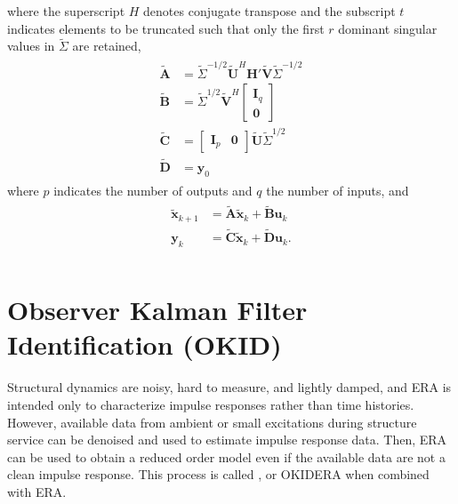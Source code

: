 \documentclass[letterpaper,10pt,english]{sphinxmanual}
\begin{document}
\sphinxAtStartPar
where the superscript \(H\) denotes conjugate transpose and the
subscript \(t\) indicates elements to be truncated such that only
the first \(r\) dominant singular values in \(\tilde{\Sigma}\)
are retained,
\begin{equation*}
\begin{split}\begin{aligned}
    \mathbf{\tilde{A}} &= \tilde{\Sigma}^{-1/2}\mathbf{\tilde{U}}^{H}\mathbf{H'\tilde{V}}\tilde{\Sigma}^{-1/2} \\
    \mathbf{\tilde{B}} &= \tilde{\Sigma}^{1/2}\mathbf{\tilde{V}}^{H}
                        \begin{bmatrix} \mathbf{I}_{q} \\ \mathbf{0} \end{bmatrix} \\
    \mathbf{\tilde{C}} &= \begin{bmatrix} \mathbf{I}_{p} & \mathbf{0} \end{bmatrix} \mathbf{\tilde{U}}\tilde{\Sigma}^{1/2} \\
    \mathbf{\tilde{D}} &= \mathbf{y}_{0}
\end{aligned}\end{split}
\end{equation*}
\sphinxAtStartPar
where \(p\) indicates the number of outputs and \(q\) the number
of inputs, and
\begin{equation*}
\begin{split}\begin{aligned}
    \mathbf{\tilde{x}}_{k+1} &= \mathbf{\tilde{A}\tilde{x}}_{k} + \mathbf{\tilde{B}u}_{k} \\
    \mathbf{y}_{k} &= \mathbf{\tilde{C}\tilde{x}}_{k} + \mathbf{\tilde{D}u}_{k}. \\
\end{aligned}\end{split}
\end{equation*}
\sphinxstepscope


\section{Observer Kalman Filter Identification (OKID)}
\label{\detokenize{theory/okid:observer-kalman-filter-identification-okid}}\label{\detokenize{theory/okid::doc}}
\sphinxAtStartPar
Structural dynamics are noisy, hard to measure, and lightly damped, and
ERA is intended only to characterize impulse responses rather than time
histories. However, available data from ambient or small excitations
during structure service can be de\sphinxhyphen{}noised and used to estimate impulse
response data. Then, ERA can be used to obtain a reduced order model
even if the available data are not a clean impulse response. This
process is called , or OKID\sphinxhyphen{}ERA when
combined with ERA.
\end{document}
